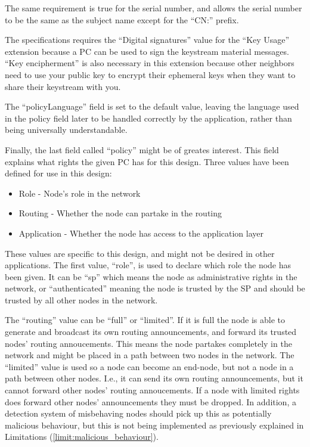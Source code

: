The same requirement is true for the serial number, and allows the serial number
to be the same as the subject name except for the ``CN:'' prefix.

The specifications requires the ``Digital signatures'' value for the ``Key
Usage'' extension because a \ac{PC} can be used to sign the keystream material
messages. ``Key encipherment'' is also necessary in this extension because other
neighbors need to use your public key to encrypt their ephemeral keys when they
want to share their keystream with you.

The ``policyLanguage'' field is set to the default value, leaving the
language used in the policy field later to be handled correctly by the
application, rather than being universally understandable.

Finally, the last field called ``policy'' might be of greates interest. This
field explains what rights the given \ac{PC} has for this design. Three values
have been defined for use in this design:

\begin{itemize}
  \item Role - Node's role in the network
  \item Routing - Whether the node can partake in the routing
  \item Application - Whether the node has access to the application layer
\end{itemize}

These values are specific to this design, and might not be desired in
other applications. The first value, ``role'', is used to declare which role the
node has been given. It can be ``sp'' which means the node as administrative
rights in the network, or ``authenticated'' meaning the node is trusted by the
\ac{SP} and should be trusted by all other nodes in the network.

The ``routing'' value can be ``full'' or ``limited''. If it is full the node is
able to generate and broadcast its own routing announcements, and forward its
trusted nodes' routing annoucements. This means the node partakes completely in
the network and might be placed in a path between two nodes in the network. The
``limited'' value is used so a node can become an end-node, but not a node in a
path between other nodes. I.e., it can send its own routing announcements, but
it cannot forward other nodes' routing annoucements. If a node with limited
rights does forward other nodes' announcements they must be dropped. In
addition, a detection system of misbehaving nodes should pick up this as
potentially malicious behaviour, but this is not being implemented as
previously explained in Limitations (\ref{limit:malicious_behaviour}).


